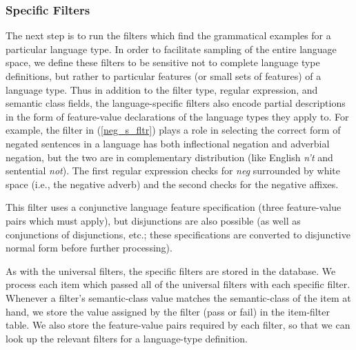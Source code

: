 \documentclass[11pt]{article}
\begin{document}
\subsubsection{Specific Filters}

The next step is to run the filters which find the grammatical
examples for a particular language type.  In order to facilitate
sampling of the entire language space, we define these filters to be
sensitive not to complete language type definitions, but rather to
particular features (or small sets of features) of a language type.
Thus in addition to the filter type, regular expression, and semantic
class fields, the language-specific filters also encode partial
descriptions in the form of feature-value declarations of the language
types they apply to.  For example, the filter in (\ref{neg_s_fltr})
plays a role in selecting the correct form of negated sentences in
a language has both inflectional negation and adverbial negation,
but the two are in complementary distribution (like English {\it n't}
and sentential {\it not}).  The first regular expression checks for
{\it neg} surrounded by white space (i.e., the negative adverb) and the
second checks for the negative affixes.

%
This filter uses a conjunctive language feature specification
(three feature-value pairs which must apply), but disjunctions are
also possible (as well as conjunctions of disjunctions, etc.; these
specifications are converted to disjunctive normal form before
further processing).

As with the universal filters, the specific filters are stored in the
database.  We process each item which passed all of the universal
filters with each specific filter.  Whenever a filter's semantic-class
value matches the semantic-class of the item at hand, we store the
value assigned by the filter (pass or fail) in the item-filter table.
We also store the feature-value pairs required by each filter, so that
we can look up the relevant filters for a language-type definition.
\end{document}
